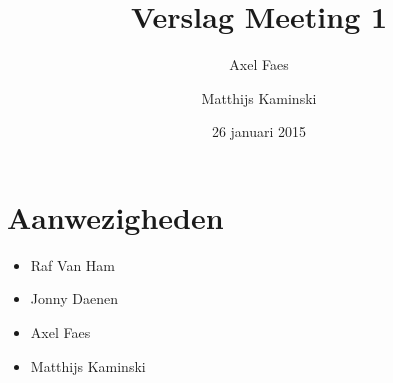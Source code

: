 \documentclass[]{article}
\begin{document}
\title{Verslag Meeting 1}
\author{Axel Faes \and Matthijs Kaminski}
\date{26 januari 2015}
\maketitle

\section{Aanwezigheden}
\begin{itemize}
\item Raf Van Ham
\item Jonny Daenen
\item Axel Faes
\item Matthijs Kaminski
\end{itemize}
\end{document}
